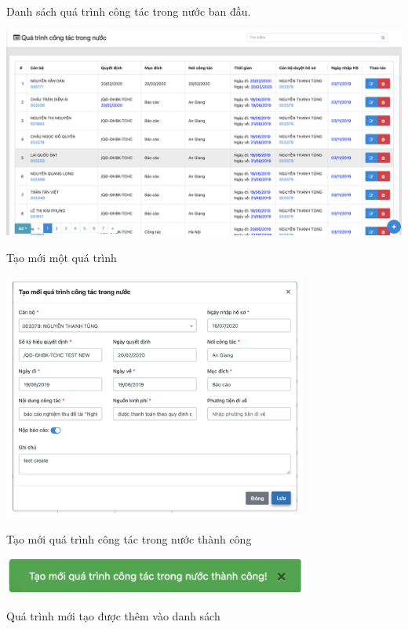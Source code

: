 Danh sách quá trình công tác trong nước ban đầu.
\begin{center}
  \captionsetup{type=figure}
  \includegraphics[width=15cm]{img/test/viewFirst.png}
\end{center}
Tạo mới một quá trình
\begin{center}
  \captionsetup{type=figure}
  \includegraphics[width=10cm]{img/test/newForm.png}
\end{center}
Tạo mới quá trình công tác trong nước thành công
\begin{center}
  \captionsetup{type=figure}
  \includegraphics[width=10cm]{img/test/aleartNew.png}
\end{center}
\newpage
Quá trình mới tạo được thêm vào danh sách
